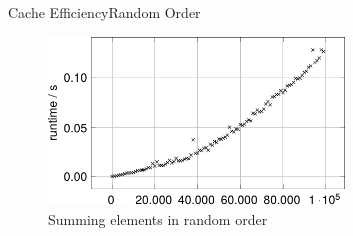 

%
%  
%
%
%  


\begin{frame}{Cache Efficiency}{Random Order}
  \begin{figure}
    \includegraphics[width=0.7\textwidth]{Images/Caching/sumrandom-plot.pdf}
%    
    \vspace{-1.0em}
    \caption{Summing elements in random order}
    \label{fig:caching:sum_random_order}
  \end{figure}
\end{frame}


